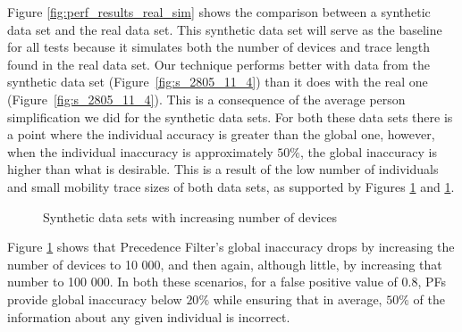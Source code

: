 Figure \ref{fig:perf_results_real_sim} shows the comparison between a
synthetic data set and the real data set. This synthetic data set will
serve as the baseline for all tests because it simulates both the
number of devices and trace length found in the real data set.  Our
technique performs better with data from the synthetic data set
(Figure~\ref{fig:s_2805_11_4}) than it does with the real one
(Figure~\ref{fig:s_2805_11_4}).  This is a consequence of the average
person simplification we did for the synthetic data sets.  For both
these data sets there is a point where the individual accuracy is
greater than the global one, however, when the individual inaccuracy
is approximately $50\%$, the global inaccuracy is higher than what is
desirable. This is a result of the low number of individuals and small
mobility trace sizes of both data sets, as supported by Figures
\ref{fig:perf_results_sim_device_number} and
\ref{fig:perf_results_sim_device_number}.

\begin{figure}[htb]
\hspace*{-0.7em}
\hspace*{-0.7em}
\caption{Synthetic data sets with increasing number of devices}
\label{fig:perf_results_sim_device_number}
\end{figure}
Figure \ref{fig:perf_results_sim_device_number} shows that Precedence
Filter's global inaccuracy drops by increasing the number of devices
to 10 000, and then again, although little, by increasing that number
to 100 000. In both these scenarios, for a false positive value of
$0.8$, PFs provide global inaccuracy below $20\%$ while ensuring that
in average, $50\%$ of the information about any given individual is
incorrect.


